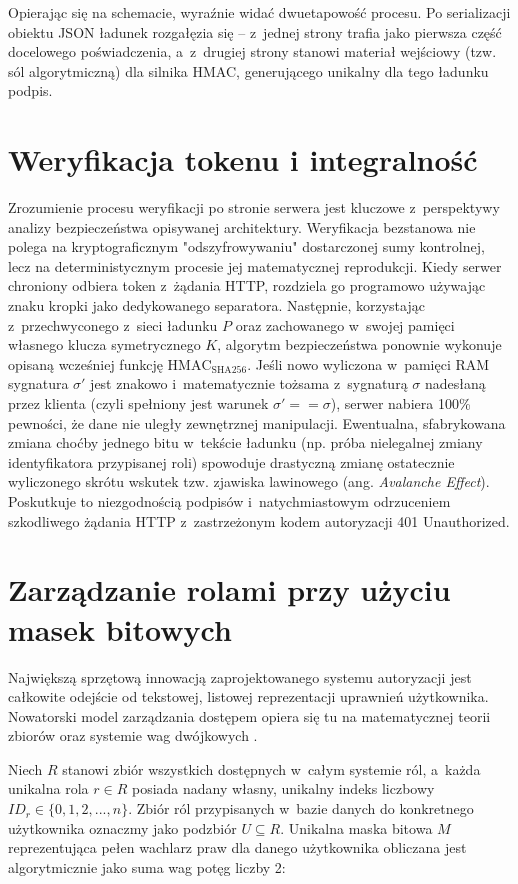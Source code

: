 \documentclass{SGGW-thesis}
\begin{document}
Opierając się na schemacie, wyraźnie widać dwuetapowość procesu. Po serializacji obiektu JSON ładunek rozgałęzia się – z~jednej strony trafia jako pierwsza część docelowego poświadczenia, a~z~drugiej strony stanowi materiał wejściowy (tzw. sól algorytmiczną) dla silnika HMAC, generującego unikalny dla tego ładunku podpis.

\section{Weryfikacja tokenu i integralność}

Zrozumienie procesu weryfikacji po stronie serwera jest kluczowe z~perspektywy analizy bezpieczeństwa opisywanej architektury. Weryfikacja bezstanowa nie polega na kryptograficznym "odszyfrowywaniu" dostarczonej sumy kontrolnej, lecz na deterministycznym procesie jej matematycznej reprodukcji.
\clearpage
Kiedy serwer chroniony odbiera token z~żądania HTTP, rozdziela go programowo używając znaku kropki jako dedykowanego separatora. Następnie, korzystając z~przechwyconego z~sieci ładunku $P$ oraz zachowanego w~swojej pamięci własnego klucza symetrycznego $K$, algorytm bezpieczeństwa ponownie wykonuje opisaną wcześniej funkcję $\text{HMAC}_{\text{SHA256}}$. Jeśli nowo wyliczona w~pamięci RAM sygnatura $\sigma'$ jest znakowo i~matematycznie tożsama z~sygnaturą $\sigma$ nadesłaną przez klienta (czyli spełniony jest warunek $\sigma' == \sigma$), serwer nabiera 100\% pewności, że dane nie uległy zewnętrznej manipulacji. Ewentualna, sfabrykowana zmiana choćby jednego bitu w~tekście ładunku (np. próba nielegalnej zmiany identyfikatora przypisanej roli) spowoduje drastyczną zmianę ostatecznie wyliczonego skrótu wskutek tzw. zjawiska lawinowego (ang. \textit{Avalanche Effect}). Poskutkuje to niezgodnością podpisów i~natychmiastowym odrzuceniem szkodliwego żądania HTTP z~zastrzeżonym kodem autoryzacji 401 Unauthorized.

\section{Zarządzanie rolami przy użyciu masek bitowych}

Największą sprzętową innowacją zaprojektowanego systemu autoryzacji jest całkowite odejście od tekstowej, listowej reprezentacji uprawnień użytkownika. Nowatorski model zarządzania dostępem opiera się tu na matematycznej teorii zbiorów oraz systemie wag dwójkowych \cite{stallings2017}.

Niech $R$ stanowi zbiór wszystkich dostępnych w~całym systemie ról, a~każda unikalna rola $r \in R$ posiada nadany własny, unikalny indeks liczbowy $ID_r \in \{0, 1, 2, ..., n\}$. Zbiór ról przypisanych w~bazie danych do konkretnego użytkownika oznaczmy jako podzbiór $U \subseteq R$. Unikalna maska bitowa $M$ reprezentująca pełen wachlarz praw dla danego użytkownika obliczana jest algorytmicznie jako suma wag potęg liczby 2:
\end{document}
